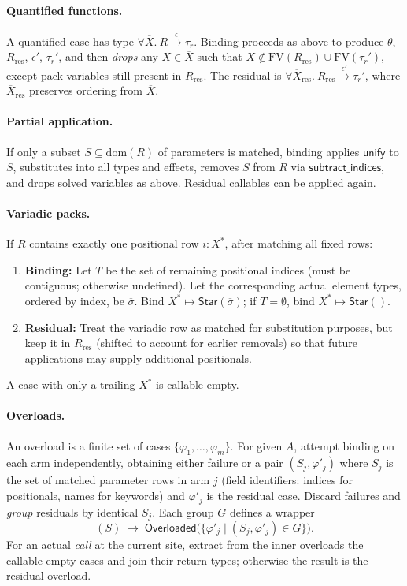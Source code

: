 \paragraph{Quantified functions.}
A quantified case has type $\forall\overline{X}.~R \xrightarrow{\epsilon} \tau_r$.
Binding proceeds as above to produce $\theta$, $R_{\mathrm{res}}$, $\epsilon'$, $\tau_r'$,
and then \emph{drops} any $X\in\overline{X}$ such that $X\not\in \mathrm{FV}(R_{\mathrm{res}})\cup \mathrm{FV}(\tau_r')$,
except pack variables still present in $R_{\mathrm{res}}$.
The residual is $\forall\overline{X}_{\mathrm{res}}.~R_{\mathrm{res}} \xrightarrow{\epsilon'} \tau_r'$,
where $\overline{X}_{\mathrm{res}}$ preserves ordering from $\overline{X}$.

\paragraph{Partial application.}
If only a subset $S \subseteq \mathrm{dom}(R)$ of parameters is matched,
binding applies $\mathsf{unify}$ to $S$, substitutes into all types and effects,
removes $S$ from $R$ via $\mathsf{subtract\_indices}$, and drops solved variables as above.
Residual callables can be applied again.

\paragraph{Variadic packs.}
If $R$ contains exactly one positional row $i:X^*$, after matching all fixed rows:
\begin{enumerate}
    \item \textbf{Binding:} Let $T$ be the set of remaining positional indices (must be contiguous; otherwise undefined).
          Let the corresponding actual element types, ordered by index, be $\overline{\sigma}$.
          Bind $X^* \mapsto \mathsf{Star}(\overline{\sigma})$; if $T=\emptyset$, bind $X^* \mapsto \mathsf{Star}()$.
    \item \textbf{Residual:} Treat the variadic row as matched for substitution purposes,
          but keep it in $R_{\mathrm{res}}$ (shifted to account for earlier removals) so that
          future applications may supply additional positionals.
\end{enumerate}
A case with only a trailing $X^*$ is callable-empty.

\paragraph{Overloads.}
An overload is a finite set of cases $\{ \varphi_1,\dots,\varphi_m \}$.
For given $A$, attempt binding on each arm independently, obtaining
either failure or a pair $(S_j,\varphi'_j)$ where $S_j$ is the set of matched parameter
rows in arm $j$ (field identifiers: indices for positionals, names for keywords) and $\varphi'_j$ is the residual case.
Discard failures and \emph{group} residuals by identical $S_j$.
Each group $G$ defines a wrapper
\[
(S) \;\to\; \mathsf{Overloaded}\bigl(\{\varphi'_j \mid (S_j,\varphi'_j)\in G\}\bigr).
\]
For an actual \emph{call} at the current site, extract from the inner overloads
the callable-empty cases and join their return types; otherwise the result is the residual overload.

